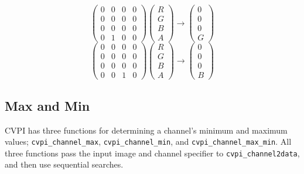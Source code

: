 \documentclass[12pt]{report}
\begin{document}
    \[
 \begin{pmatrix} 0 & 0 & 0 & 0 \\ 0 & 0 & 0 & 0 \\ 0 & 0 & 0 & 0 \\ 0 & 1 & 0 & 0 \end{pmatrix}
          \begin{pmatrix} R \\ G \\ B \\ A \end{pmatrix} \to \begin{pmatrix} 0 \\ 0 \\ 0 \\ G \end{pmatrix}
\]
    \[
 \begin{pmatrix} 0 & 0 & 0 & 0 \\ 0 & 0 & 0 & 0 \\ 0 & 0 & 0 & 0 \\ 0 & 0 & 1 & 0 \end{pmatrix}
          \begin{pmatrix} R \\ G \\ B \\ A \end{pmatrix} \to \begin{pmatrix} 0 \\ 0 \\ 0 \\ B \end{pmatrix}
\]

\subsection{Max and Min}
\label{sec-3-11-3}
CVPI has three functions for determining a channel's minimum and
maximum values; {\tt cvpi\_channel\_max}, {\tt cvpi\_channel\_min}, and
{\tt cvpi\_channel\_max\_min}. All three functions pass the input image
and channel specifier to {\tt cvpi\_channel2data}, and then use
sequential searches.
\end{document}
